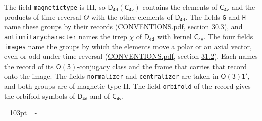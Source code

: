 \documentclass[10pt,a4paper]{article}
\newcommand{\needspace}[1]{\par\penalty-100\begingroup\dimen0=#1\relax\dimen2=\pagegoal
  \advance\dimen2-\pagetotal\ifdim\dimen0>\dimen2\relax\ifdim\dimen2>0pt\vfil\break\fi\fi
  \endgroup}
\numberwithin{equation}{section}
\newcommand{\grp}[1]{\mathsf{#1}}
\begin{document}
The field \texttt{magnetictype} is III, so $\grp{D_{4d}}(\grp{C_{4v}})$ contains the elements of $\grp{C_{4v}}$ and the products of time reversal $\varTheta$ with the other elements of $\grp{D_{4d}}$. The fields \texttt{G} and \texttt{H} name these groups by their records (\href{../../CONVENTIONS.pdf}{CONVENTIONS.pdf}, section \href{../../CONVENTIONS.pdf\#conv.30.3}{30.3}), and \texttt{antiunitarycharacter} names the irrep $\chi$ of $\grp{D_{4d}}$ with kernel $\grp{C_{4v}}$. The four fields \texttt{images} name the groups by which the elements move a polar or an axial vector, even or odd under time reversal (\href{../../CONVENTIONS.pdf}{CONVENTIONS.pdf}, section \href{../../CONVENTIONS.pdf\#conv.31.2}{31.2}). Each names the record of its $\grp{O(3)}$-conjugacy class and the frame that carries that record onto the image. The fields \texttt{normalizer} and \texttt{centralizer} are taken in $\grp{O(3)1'}$, and both groups are of magnetic type II. The field \texttt{orbifold} of the record gives the orbifold symbols of $\grp{D_{4d}}$ and of $\grp{C_{4v}}$.
\needspace{103pt}
\end{document}

